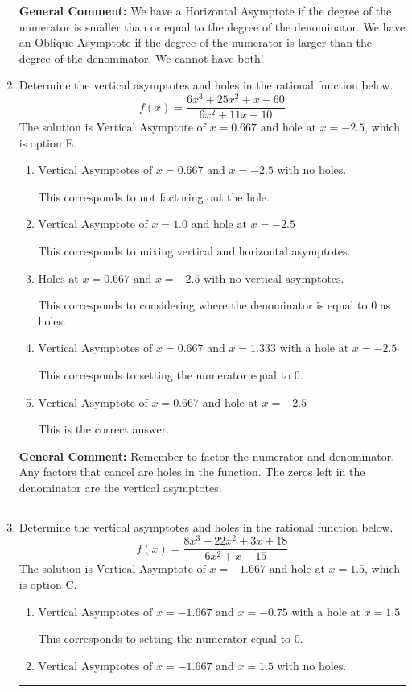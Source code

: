 \documentclass{extbook}[14pt]
\newcommand{\litem}[1]{\item #1

\rule{\textwidth}{0.4pt}}
\begin{document}
\begin{enumerate}
{\textbf{General Comment:} We have a Horizontal Asymptote if the degree of the numerator is smaller than or equal to the degree of the denominator. We have an Oblique Asymptote if the degree of the numerator is larger than the degree of the denominator. We cannot have both!
}
\litem{
Determine the vertical asymptotes and holes in the rational function below.
\[ f(x) = \frac{6x^{3} +25 x^{2} +x -60}{6x^{2} +11 x -10} \]The solution is \( \text{Vertical Asymptote of } x = 0.667 \text{ and hole at } x = -2.5 \), which is option E.\begin{enumerate}[label=\Alph*.]
\item \( \text{Vertical Asymptotes of } x = 0.667 \text{ and } x = -2.5 \text{ with no holes.} \)

This corresponds to not factoring out the hole.
\item \( \text{Vertical Asymptote of } x = 1.0 \text{ and hole at } x = -2.5 \)

This corresponds to mixing vertical and horizontal asymptotes.
\item \( \text{Holes at } x = 0.667 \text{ and } x = -2.5 \text{ with no vertical asymptotes.} \)

This corresponds to considering where the denominator is equal to 0 as holes.
\item \( \text{Vertical Asymptotes of } x = 0.667 \text{ and } x = 1.333 \text{ with a hole at } x = -2.5 \)

This corresponds to setting the numerator equal to 0.
\item \( \text{Vertical Asymptote of } x = 0.667 \text{ and hole at } x = -2.5 \)

This is the correct answer.
\end{enumerate}

\textbf{General Comment:} Remember to factor the numerator and denominator. Any factors that cancel are holes in the function. The zeros left in the denominator are the vertical asymptotes.
}
\litem{
Determine the vertical asymptotes and holes in the rational function below.
\[ f(x) = \frac{8x^{3} -22 x^{2} +3 x + 18}{6x^{2} +x -15} \]The solution is \( \text{Vertical Asymptote of } x = -1.667 \text{ and hole at } x = 1.5 \), which is option C.\begin{enumerate}[label=\Alph*.]
\item \( \text{Vertical Asymptotes of } x = -1.667 \text{ and } x = -0.75 \text{ with a hole at } x = 1.5 \)

This corresponds to setting the numerator equal to 0.
\item \( \text{Vertical Asymptotes of } x = -1.667 \text{ and } x = 1.5 \text{ with no holes.} \)


\end{enumerate}}
\end{enumerate}
\end{document}

